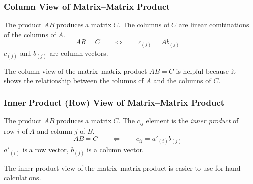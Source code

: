 \documentclass[10pt]{beamer}
\begin{document}
\begin{frame}
\frametitle{Column View of Matrix--Matrix Product}

The product $AB$ produces a matrix $C$.  The columns of $C$
are linear combinations of the columns of $A$.
\begin{equation*}
    AB = C \qquad \Longleftrightarrow \qquad c_{(j)} = Ab_{(j)}
\end{equation*}
$c_{(j)}$ and $b_{(j)}$ are column vectors.

\begin{center}
\end{center}

The column view of the matrix--matrix product $AB=C$ is helpful because
it shows the relationship between the columns of $A$ and the columns of $C$.

\end{frame}
\begin{frame}
\frametitle{Inner Product (Row) View of Matrix--Matrix Product}

The product $AB$ produces a matrix $C$.  The $c_{ij}$ element
is the \emph{inner product} of row $i$ of $A$ and column $j$ of $B$.
\begin{equation*}
    AB = C \qquad \Longleftrightarrow \qquad c_{ij} = a'_{(i)}b_{(j)}
\end{equation*}
$a'_{(i)}$ is a row vector, $b_{(j)}$ is a column vector.

\begin{center}
\end{center}

The inner product view of the matrix--matrix product is easier
to use for hand calculations.


\end{frame}
\end{document}
